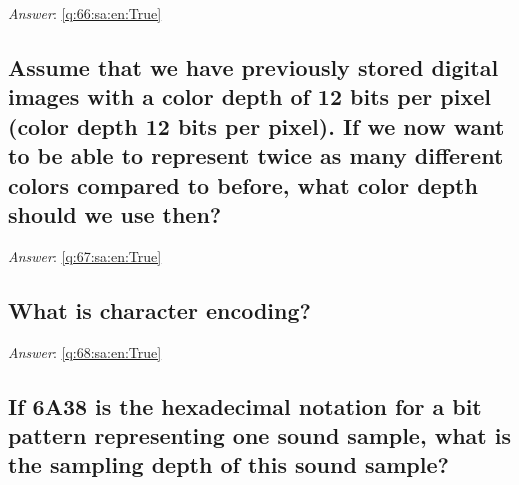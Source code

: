\documentclass[a4paper,11pt,oneside]{article}
\begin{document}
\begin{sloppypar}
\label{q:66:sa:en:False}

\vspace{2cm}

\noindent\makebox[\textwidth]{\hrulefill}

\vspace{1cm}

\textit{Answer}: \autoref{q:66:sa:en:True}



\subsection{Assume that we have previously stored digital images with a color depth of 12 bits per pixel (color depth 12 bits per pixel). If we now want to be able to represent twice as many different colors compared to before, what color depth should we use then?}

\label{q:67:sa:en:False}

\vspace{2cm}

\noindent\makebox[\textwidth]{\hrulefill}

\vspace{1cm}

\textit{Answer}: \autoref{q:67:sa:en:True}



\subsection{What is character encoding?}

\label{q:68:sa:en:False}

\vspace{2cm}

\noindent\makebox[\textwidth]{\hrulefill}

\vspace{1cm}

\textit{Answer}: \autoref{q:68:sa:en:True}



\subsection{If 6A38 is the hexadecimal notation for a bit pattern representing one sound sample, what is the sampling depth of this sound sample?}

\label{q:71:sa:en:False}

\vspace{2cm}


\end{sloppypar}
\end{document}
